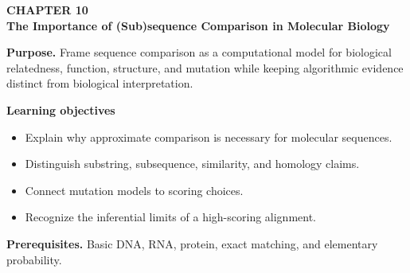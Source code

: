 \documentclass[11pt]{article}
\begin{document}
\begin{tcolorbox}[
  enhanced,breakable,colback=Primary!4,colframe=Primary,boxrule=0.9pt,
  arc=2mm,left=3mm,right=3mm,top=2.5mm,bottom=2.5mm]
{\sffamily\color{Accent}\bfseries CHAPTER 10}\\[-1pt]
{\sffamily\LARGE\bfseries\color{Primary} The Importance of (Sub)sequence Comparison in Molecular Biology}

\vspace{2pt}
\textbf{Purpose.} Frame sequence comparison as a computational model for biological relatedness, function, structure, and mutation while keeping algorithmic evidence distinct from biological interpretation.

\textbf{Learning objectives}
\begin{itemize}
  \item Explain why approximate comparison is necessary for molecular sequences.
  \item Distinguish substring, subsequence, similarity, and homology claims.
  \item Connect mutation models to scoring choices.
  \item Recognize the inferential limits of a high-scoring alignment.
\end{itemize}

\textbf{Prerequisites.} Basic DNA, RNA, protein, exact matching, and elementary probability.
\end{tcolorbox}
\end{document}
